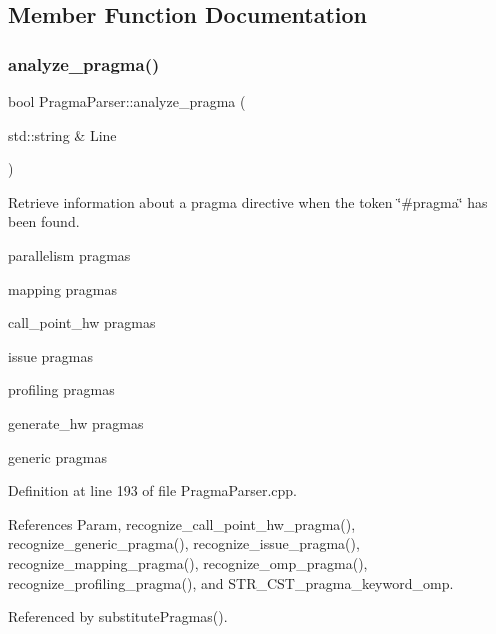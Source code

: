 \subsection{Member Function Documentation}
\mbox{\label{classPragmaParser_ab8df876c3d71e8de2ff0b60a00d68c3b}} 
\subsubsection{\texorpdfstring{analyze\+\_\+pragma()}{analyze\_pragma()}}
{\footnotesize\ttfamily bool Pragma\+Parser\+::analyze\+\_\+pragma (\begin{DoxyParamCaption}\item[{std\+::string \&}]{Line }\end{DoxyParamCaption})\hspace{0.3cm}{\ttfamily [private]}}



Retrieve information about a pragma directive when the token \char`\"{}\#pragma\char`\"{} has been found. 

parallelism pragmas

mapping pragmas

call\+\_\+point\+\_\+hw pragmas

issue pragmas

profiling pragmas

generate\+\_\+hw pragmas

generic pragmas 

Definition at line 193 of file Pragma\+Parser.\+cpp.



References Param, recognize\+\_\+call\+\_\+point\+\_\+hw\+\_\+pragma(), recognize\+\_\+generic\+\_\+pragma(), recognize\+\_\+issue\+\_\+pragma(), recognize\+\_\+mapping\+\_\+pragma(), recognize\+\_\+omp\+\_\+pragma(), recognize\+\_\+profiling\+\_\+pragma(), and S\+T\+R\+\_\+\+C\+S\+T\+\_\+pragma\+\_\+keyword\+\_\+omp.



Referenced by substitute\+Pragmas().

